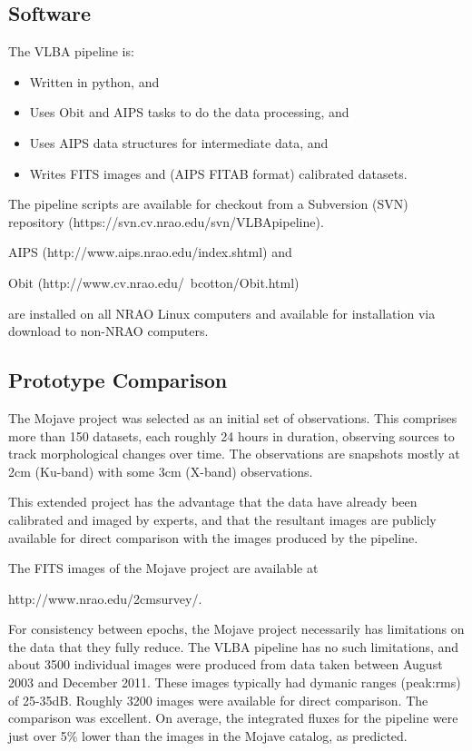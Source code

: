 \documentclass[11pt]{article}
\begin{document}
\subsection{Software}

The VLBA pipeline is:

\begin{itemize}
\item Written in python, and
\item Uses Obit and AIPS tasks to do the data processing, and
\item Uses AIPS data structures for intermediate data, and
\item Writes FITS images and (AIPS FITAB format) calibrated datasets.
\end{itemize}

The pipeline scripts are available for checkout from a Subversion
(SVN) repository (https://svn.cv.nrao.edu/svn/VLBApipeline).

AIPS (http://www.aips.nrao.edu/index.shtml) and

Obit (http://www.cv.nrao.edu/~bcotton/Obit.html)

are installed on all NRAO Linux computers and available for 
installation via download to non-NRAO computers.

\subsection{Prototype Comparison}

The Mojave project was selected as an initial set of observations.  This
comprises more than 150 datasets, each roughly 24 hours in duration, observing
sources to track morphological changes over time.  The observations are
snapshots mostly at 2cm (Ku-band) with some 3cm (X-band) observations.

This extended project has the advantage that the data have already
been calibrated and imaged by experts, and that the resultant images
are publicly available for direct comparison with the images produced
by the pipeline. 

The FITS images of the Mojave project are available at

http://www.nrao.edu/2cmsurvey/.

For consistency between epochs, the Mojave project necessarily has limitations
on the data that they fully reduce.  The VLBA pipeline has no such limitations,
and about 3500 individual images were produced from data taken between August
2003 and December 2011.  These images typically had dymanic ranges (peak:rms)
of 25-35dB.  Roughly 3200 images were available for direct comparison.  The
comparison was excellent.  On average, the integrated fluxes for the pipeline
were just over 5\% lower than the images in the Mojave catalog, as predicted.
\end{document}
